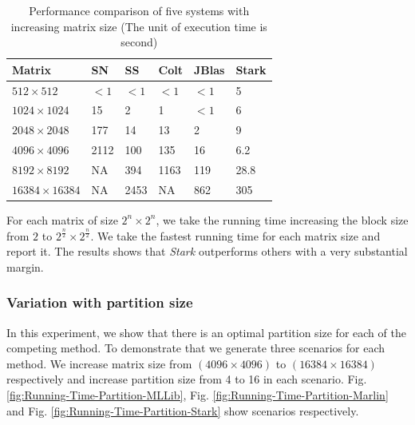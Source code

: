 \begin{table}[h!]
\caption{Performance comparison of five systems with increasing matrix size (The unit of execution time is second)}
\label{tab:CompWithSingleNode}
\begin{minipage}{\columnwidth}
\begin{center}
\begin{tabular}{llllll}
\toprule
    Matrix & SN & SS & Colt & JBlas & Stark \\
 	\toprule
    $512 \times 512$ & $<1$ & $<1$ & $<1$ & $<1$ & 5 \\
    $1024 \times 1024$ & 15 & 2 & 1 & $<1$ & 6 \\
    $2048 \times 2048$ & 177 & 14 & 13 & 2 & 9 \\
    $4096 \times 4096$ & 2112 & 100 & 135 & 16 & 6.2 \\
    $8192 \times 8192$ & NA & 394 & 1163 & 119 & 28.8 \\
    $16384 \times 16384$ & NA & 2453 & NA & 862 & 305 \\
\bottomrule
\end{tabular}
\end{center}
\end{minipage}
\end{table}

For each matrix of size $2^{n}\times 2^{n}$, we take the running time increasing the block size from $2$ to $2^{\frac{n}{2}}\times 2^{\frac{n}{2}}$. We take the fastest running time for each matrix size and report it. The results shows that \textit{Stark} outperforms others with a very substantial margin. 

\subsubsection{Variation with partition size}
In this experiment, we show that there is an optimal partition size for each of the competing method. To demonstrate that we generate three scenarios for each method. We increase matrix size from $(4096\times 4096)$ to $(16384\times 16384)$ respectively and increase partition size from 4 to 16 in each scenario. Fig. \ref{fig:Running-Time-Partition-MLLib}, Fig. \ref{fig:Running-Time-Partition-Marlin} and Fig. \ref{fig:Running-Time-Partition-Stark} show scenarios respectively.

